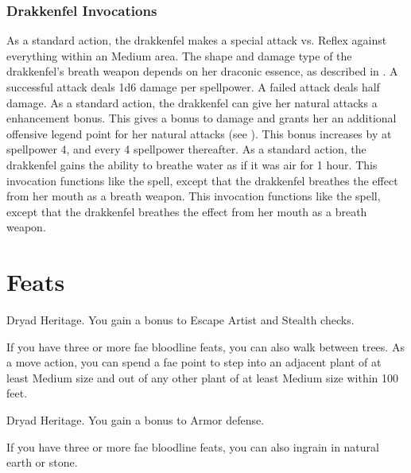         \subsubsection{Drakkenfel Invocations}
            As a standard action, the drakkenfel makes a special attack vs. Reflex against everything within an Medium area.
            The shape and damage type of the drakkenfel's breath weapon depends on her draconic essence, as described in .
            A successful attack deals 1d6 damage per spellpower.
            A failed attack deals half damage.
            As a standard action, the drakkenfel can give her natural attacks a  enhancement bonus.
            This gives a  bonus to damage and grants her an additional offensive legend point for her natural attacks (see ).
            This bonus increases by  at spellpower 4, and every 4 spellpower thereafter.
            As a standard action, the drakkenfel gains the ability to breathe water as if it was air for 1 hour.
            This invocation functions like the  spell, except that the drakkenfel breathes the effect from her mouth as a breath weapon.
            This invocation functions like the  spell, except that the drakkenfel breathes the effect from her mouth as a breath weapon.

\section{Feats}

    \featpre Dryad Heritage.
    \featben You gain a  bonus to Escape Artist and Stealth checks.

    If you have three or more fae bloodline feats, you can also walk between trees. As a move action, you can spend a fae point to step into an adjacent plant of at least Medium size and out of any other plant of at least Medium size within 100 feet.

    \featpre Dryad Heritage.
    \featben You gain a  bonus to Armor defense.

    If you have three or more fae bloodline feats, you can also ingrain in natural earth or stone.


